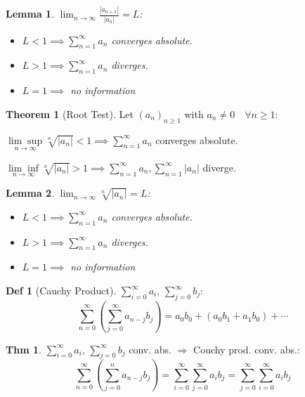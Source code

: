 \documentclass[a4paper, 10pt]{article}
\newtheorem*{lemma}{Lemma}
\theoremstyle{definition}
\newtheorem*{theorem}{Thm}
\newtheorem*{definition}{Def}
\theoremstyle{ex}
\theoremstyle{named}
\newtheorem*{ntheorem_wrapper}{Theorem}
\newenvironment{ntheorem}%
    {\begin{mdframed}[style=important]\begin{ntheorem_wrapper}}%
    {\end{ntheorem_wrapper}\end{mdframed}}
\begin{document}
\begin{lemma}
    $\lim_{n\to\infty} \frac{|a_{n+1}|}{|a_n|} = L$:

    \begin{itemize}
        \item $L < 1 \implies \sum_{n=1}^\infty a_n$ converges absolute.
        \item $L > 1 \implies \sum_{n=1}^\infty a_n$ diverges.
        \item $L = 1 \implies$ no information
    \end{itemize}
\end{lemma}

\begin{ntheorem}[Root Test]
    Let $(a_n)_{n \geq 1}$ with $a_n \neq 0 \quad \forall n\geq 1$:

    $\underset{n\to\infty}{\lim\sup} \sqrt[n]{|a_n|} < 1 \implies \sum_{n=1}^\infty a_n$ converges absolute.

    $\underset{n\to\infty}{\lim\inf} \sqrt[n]{|a_n|} > 1 \implies \sum_{n=1}^\infty a_n, \sum_{n=1}^\infty |a_n|$ diverge.
\end{ntheorem}

\begin{lemma}
    $\lim_{n\to\infty} \sqrt[n]{|a_n|} = L$:

    \begin{itemize}
        \item $L < 1 \implies \sum_{n=1}^\infty a_n$ converges absolute.
        \item $L > 1 \implies \sum_{n=1}^\infty a_n$ diverges.
        \item $L = 1 \implies$ no information
    \end{itemize}
\end{lemma}

\begin{definition}[Cauchy Product]
    $\sum_{i=0}^\infty a_i$, $\sum_{j=0}^\infty b_j$:
    $$\sum_{n=0}^\infty (\sum_{j=0}^\infty a_{n-j}b_j) = a_0b_0 + (a_0b_1 + a_1b_0) + \cdots$$
\end{definition}

\begin{theorem}
    $\sum\limits_{i=0}^\infty a_i$, $\sum\limits_{j=0}^\infty b_j$ conv. abs. $\Rightarrow$ Couchy prod. conv. abs.:
    $$\sum_{n=0}^\infty (\sum_{j=0}^n a_{n-j}b_j) = \sum_{i=0}^\infty \sum_{j=0}^\infty a_i b_j = \sum_{j=0}^\infty \sum_{i=0}^\infty a_i b_j$$
\end{theorem}
\end{document}
